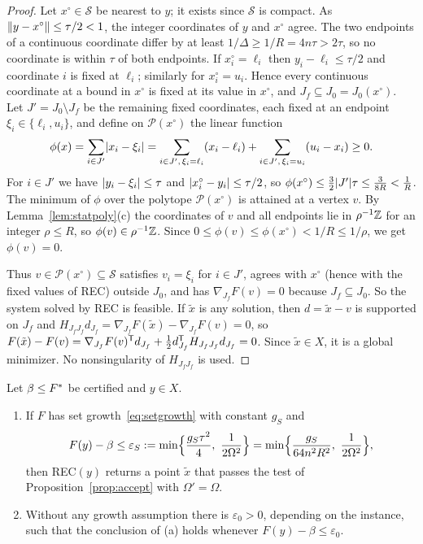 \begin{proof}
Let $x^\circ\in\mathcal S$ be nearest to $y$; it exists since $\mathcal S$ is
compact. As $\lVert y-x^\circ\rVert\le\tau/2<1$, the integer coordinates of $y$ and $x^\circ$
agree. The two endpoints of a continuous coordinate differ by at least
$1/\Delta\ge1/R=4n\tau>2\tau$, so no coordinate is within $\tau$ of both
endpoints. If $x^\circ_i=\ell_i$ then $y_i-\ell_i\le\tau/2$ and coordinate $i$ is
fixed at $\ell_i$; similarly for $x^\circ_i=u_i$. Hence every continuous coordinate
at a bound in $x^\circ$ is fixed at its value in $x^\circ$, and
$J_f\subseteq J_0=J_0(x^\circ)$. Let $J'=J_0\setminus J_f$ be the remaining
fixed coordinates, each fixed at an endpoint $\xi_i\in\{\ell_i,u_i\}$, and
define on $\mathcal P(x^\circ)$ the linear function
\[
\phi(x)=\sum_{i\in J'}\lvert x_i-\xi_i\rvert
=\sum_{i\in J',\,\xi_i=\ell_i}(x_i-\ell_i)+\sum_{i\in J',\,\xi_i=u_i}(u_i-x_i)\ge0 .
\]
For $i\in J'$ we have $\lvert y_i-\xi_i\rvert\le\tau$ and $\lvert x^\circ_i-y_i\rvert\le\tau/2$, so
$\phi(x^\circ)\le\frac32\lvert J'\rvert\tau\le\frac3{8R}<\frac1R$. The minimum of $\phi$
over the polytope $\mathcal P(x^\circ)$ is attained at a vertex $v$. By
Lemma~\ref{lem:statpoly}(c) the coordinates of $v$ and all endpoints lie in
$\rho^{-1}\mathbb Z$ for an integer $\rho\le R$, so $\phi(v)\in\rho^{-1}\mathbb Z$.
Since $0\le\phi(v)\le\phi(x^\circ)<1/R\le1/\rho$, we get $\phi(v)=0$.

Thus $v\in\mathcal P(x^\circ)\subseteq\mathcal S$ satisfies $v_i=\xi_i$ for
$i\in J'$, agrees with $x^\circ$ (hence with the fixed values of REC) outside $J_0$,
and has $\nabla_{J_f}F(v)=0$ because $J_f\subseteq J_0$. So the system solved by
REC is feasible. If $\tilde x$ is any solution, then $d=\tilde x-v$ is
supported on $J_f$ and $H_{J_fJ_f}d_{J_f}=\nabla_{J_f}F(\tilde x)-\nabla_{J_f}F(v)=0$, so
$F(\tilde x)-F(v)=\nabla_{J_f}F(v)^{\mathsf T}d_{J_f}+\frac12d_{J_f}^{\mathsf T}H_{J_fJ_f}d_{J_f}=0$.
Since $\tilde x\in X$, it is a global minimizer. No nonsingularity of
$H_{J_fJ_f}$ is used.
\end{proof}

\begin{theorem}\label{thm:transfer}
Let $\beta\le F^{*}$ be certified and $y\in X$.
\begin{enumerate}[label=(\alph*)]
\item If $F$ has set growth~\eqref{eq:setgrowth} with constant $g_S$ and
\begin{equation}\label{eq:transfer-threshold}
F(y)-\beta\le\varepsilon_S:=\min\Bigl\{\frac{g_S\tau^2}{4},\
\frac1{2\Omega^2}\Bigr\}
=\min\Bigl\{\frac{g_S}{64n^2R^2},\ \frac1{2\Omega^2}\Bigr\},
\end{equation}
then REC$(y)$ returns a point $\tilde x$ that passes the test of
Proposition~\ref{prop:accept} with $\Omega'=\Omega$.
\item Without any growth assumption there is $\varepsilon_0>0$, depending on
the instance, such that the conclusion of (a) holds whenever
$F(y)-\beta\le\varepsilon_0$.
\end{enumerate}
\end{theorem}

